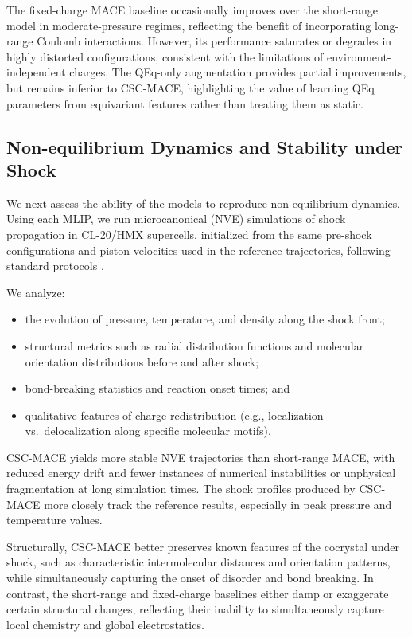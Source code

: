 \documentclass{article}
\begin{document}
The fixed-charge MACE baseline occasionally improves over the short-range model in moderate-pressure regimes, reflecting the benefit of incorporating long-range Coulomb interactions. However, its performance saturates or degrades in highly distorted configurations, consistent with the limitations of environment-independent charges. The QEq-only augmentation provides partial improvements, but remains inferior to CSC-MACE, highlighting the value of learning QEq parameters from equivariant features rather than treating them as static.

\subsection{Non-equilibrium Dynamics and Stability under Shock}

We next assess the ability of the models to reproduce non-equilibrium dynamics. Using each MLIP, we run microcanonical (NVE) simulations of shock propagation in CL-20/HMX supercells, initialized from the same pre-shock configurations and piston velocities used in the reference trajectories, following standard protocols \cite{menikoff2016shock,dlott1999ultrafast}.

We analyze:
\begin{itemize}
    \item the evolution of pressure, temperature, and density along the shock front;
    \item structural metrics such as radial distribution functions and molecular orientation distributions before and after shock;
    \item bond-breaking statistics and reaction onset times; and
    \item qualitative features of charge redistribution (e.g., localization vs.\ delocalization along specific molecular motifs).
\end{itemize}

CSC-MACE yields more stable NVE trajectories than short-range MACE, with reduced energy drift and fewer instances of numerical instabilities or unphysical fragmentation at long simulation times. The shock profiles produced by CSC-MACE more closely track the reference results, especially in peak pressure and temperature values.

Structurally, CSC-MACE better preserves known features of the cocrystal under shock, such as characteristic intermolecular distances and orientation patterns, while simultaneously capturing the onset of disorder and bond breaking. In contrast, the short-range and fixed-charge baselines either damp or exaggerate certain structural changes, reflecting their inability to simultaneously capture local chemistry and global electrostatics.
\end{document}
